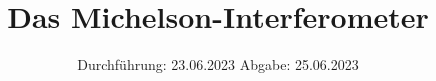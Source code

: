 

\subject{V401}
\title{Das Michelson-Interferometer}
\date{%
  Durchführung: 23.06.2023
  \hspace{3em}
  Abgabe: 25.06.2023
}



\maketitle
\thispagestyle{empty}
\tableofcontents
\newpage







\printbibliography{}


